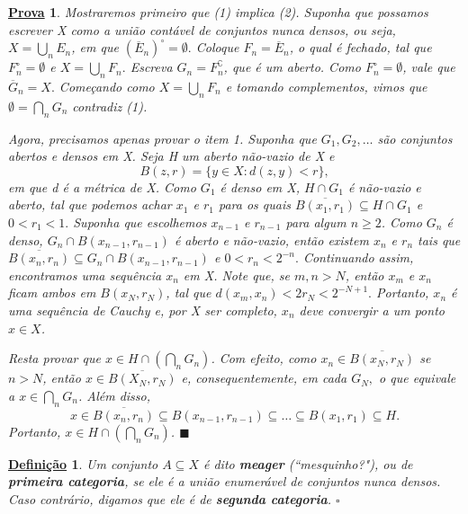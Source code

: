 \documentclass{article}
\newtheorem*{def*}{\underline{Defini\c c\~ao}}
\newtheorem*{proof*}{\underline{Prova}}
\renewcommand\qedsymbol{$\blacksquare$}
\begin{document}
 \begin{proof*}
   Mostraremos primeiro que (1) implica (2). Suponha que possamos escrever X como a união contável de conjuntos nunca densos, ou seja, \(X = \bigcup_{n}^{}E_{n}\), em que \((\overline{E}_{n})^{\circ } = \emptyset .\) Coloque \(F_{n} = \overline{E}_{n}\), o qual é fechado, tal que 
   \(F_{n}^{\circ } = \emptyset \) e \(X = \bigcup_{n}^{}F_{n}.\) Escreva \(G_{n} = F_{n}^{\complement}\), que é um aberto. Como \(F_{n}^{\circ } = \emptyset \), vale que \(\overline{G}_{n} = X.\) Começando como \(X = \bigcup_{n}^{}F_{n}\) e tomando complementos, vimos que \(\emptyset = \bigcap_{n}^{}G_{n}\) contradiz (1).

   Agora, precisamos apenas provar o item 1. Suponha que \(G_1, G_2, \dotsc \) são conjuntos abertos e densos em X. Seja H um aberto não-vazio de X e 
     \[
       B(z, r) = \{y\in X: d(z, y) < r\},
     \]
em que d é a métrica de X. Como \(G_{1}\) é denso em X, \(H\cap G_1\) é não-vazio e aberto, tal que podemos achar \(x_1\) e \(r_1\) para os quais \(\overline{B(x_1, r_1)}\subseteq H\cap G_1\) e \(0 < r_1 < 1.\) Suponha que escolhemos 
 \(x_{n-1}\) e \(r_{n-1}\) para algum \(n\geq 2\). Como \(G_{n}\) é denso, \(G_{n}\cap B(x_{n-1}, r_{n-1})\) é aberto e não-vazio, então existem \(x_{n}\) e \(r_{n}\) tais que \(\overline{B(x_{n}, r_{n})}\subseteq G_{n}\cap B(x_{n-1}, r_{n-1})\) e \(0< r_{n} < 2^{-n}.\) Continuando assim, encontramos uma sequência \(x_{n}\) em X. 
 Note que, se \(m, n > N\), então \(x_{m}\) e \(x_{n}\) ficam ambos em \(B(x_{N}, r_{N})\), tal que \(d(x_{m}, x_{n}) < 2r_{N} < 2^{-N+1}.\) Portanto, \(x_{n}\) é uma sequência de Cauchy e, por X ser completo, \(x_{n}\) deve convergir a um ponto \(x\in X\). 

  Resta provar que \(x\in H \cap (\bigcap_{n}^{}G_{n})\). Com efeito, como \(x_{n}\in \overline{B(x_{N}, r_{N})}\) se \(n > N\), então \(x\in \overline{B(X_{N}, r_{N})} \) e, consequentemente, em cada \(G_{N},\) o que equivale a \(x\in \bigcap_{n}^{}G_{n}\). Além disso, 
    \[
      x\in \overline{B(x_{n}, r_{n})}\subseteq B(x_{n-1}, r_{n-1})\subseteq \dotsc \subseteq B(x_1, r_1)\subseteq H.
    \]
  Portanto, \(x\in H\cap (\bigcap_{n}^{}G_{n})\). \qedsymbol
 \end{proof*}
\begin{def*}
  Um conjunto \(A\subseteq X\) é dito \textbf{meager} (``mesquinho?"), ou de \textbf{primeira categoria}, se ele é a união enumerável de conjuntos nunca densos. Caso contrário, digamos que ele é de \textbf{segunda categoria}. \(\square\)
\end{def*}
\end{document}
